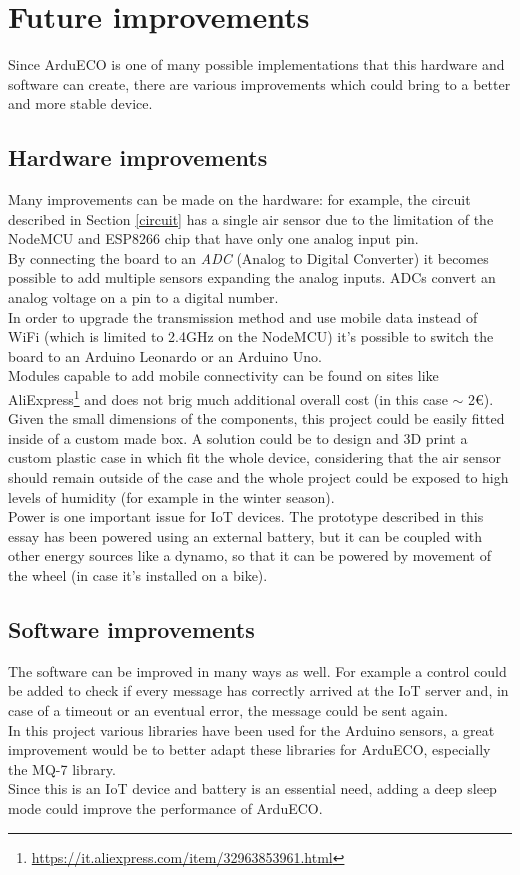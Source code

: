 \documentclass[conference]{IEEEtran}
\begin{document}
\section{Future improvements}\label{improvements}
	Since ArduECO is one of many possible implementations that this hardware and software can create, there are various improvements which could bring to a better and more stable device.
	
	\subsection{Hardware improvements}
		Many improvements can be made on the hardware: for example, the circuit described in Section \ref{circuit} has a single air sensor due to the limitation of the NodeMCU and ESP8266 chip that have only one analog input pin.\\
		By connecting the board to an \textit{ADC} (Analog to Digital Converter) it becomes possible to add multiple sensors expanding the analog inputs.
		ADCs convert an analog voltage on a pin to a digital number\cite{adc}.\\
		In order to upgrade the transmission method and use mobile data instead of WiFi (which is limited to 2.4GHz on the NodeMCU) it's possible to switch the board to an Arduino Leonardo or an Arduino Uno.\\
		Modules capable to add mobile connectivity can be found on sites like AliExpress\footnote{\href{https://it.aliexpress.com/item/32963853961.html}{https://it.aliexpress.com/item/32963853961.html}} and does not brig much additional overall cost (in this case $ \sim $ 2\euro).\\
		Given the small dimensions of the components, this project could be easily fitted inside of a custom made box.
		A solution could be to design and 3D print a custom plastic case in which fit the whole device, considering that the air sensor should remain outside of the case and the whole project could be exposed to high levels of humidity (for example in the winter season).\\
		Power is one important issue for IoT devices.
		The prototype described in this essay has been powered using an external battery, but it can be coupled with other energy sources like a dynamo, so that it can be powered by movement of the wheel (in case it's installed on a bike).
	
	\subsection{Software improvements}	
		The software can be improved in many ways as well.
		For example a control could be added to check if every message has correctly arrived at the IoT server and, in case of a timeout or an eventual error, the message could be sent again.\\
		In this project various libraries have been used for the Arduino sensors, a great improvement would be to better adapt these libraries for ArduECO, especially the MQ-7 library.\\
		Since this is an IoT device and battery is an essential need, adding a deep sleep mode could improve the performance of ArduECO.
		
\end{document}
